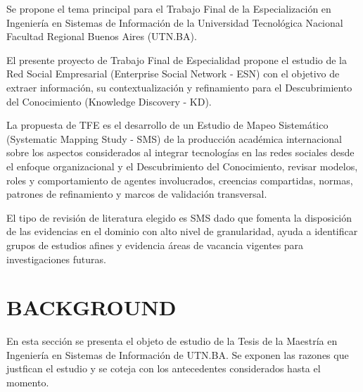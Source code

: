 \documentclass[a4paper,fleqn,spanish]{cas-dc}
\begin{document}
Se propone el tema principal para el Trabajo Final de la Especialización en
Ingeniería en Sistemas de Información de la Universidad Tecnológica Nacional
Facultad Regional Buenos Aires (UTN.BA).


El presente proyecto de Trabajo Final de Especialidad propone el estudio de la
Red Social Empresarial (Enterprise Social Network - ESN) con el objetivo de
extraer información, su contextualización y refinamiento para el Descubrimiento
del Conocimiento (Knowledge Discovery - KD).

La propuesta de TFE es el desarrollo de un Estudio de Mapeo Sistemático
(Systematic Mapping Study - SMS) de la producción académica internacional sobre
los aspectos considerados al integrar tecnologías en las redes sociales desde
el enfoque organizacional y el Descubrimiento del Conocimiento, revisar
modelos, roles y comportamiento de agentes involucrados, creencias compartidas,
normas, patrones de refinamiento y marcos de validación transversal.

El tipo de revisión de literatura elegido es SMS dado que fomenta la
disposición de las evidencias en el dominio con alto nivel de granularidad,
ayuda a identificar grupos de estudios afines y evidencia áreas de vacancia
vigentes para investigaciones futuras.


\section{BACKGROUND}\label{marco}

En esta sección se presenta el objeto de estudio de la Tesis de la Maestría en
Ingeniería en Sistemas de Información de UTN.BA. Se exponen las razones que
justfican el estudio y se coteja con los antecedentes considerados hasta el
momento.
\end{document}
